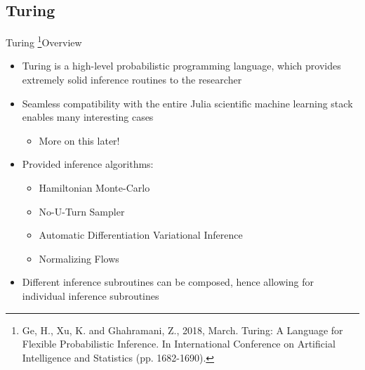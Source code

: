 \documentclass[AERbeamer%
              ,optEnglish%
              ,optBiber%
              ,optBibstyleAlphabetic%
              ,optBeamerClassicFormat%
              ]{AERlatex}%
\begin{document}
\subsection{Turing}
\begin{frame}[c]{Turing \footnote{Ge, H., Xu, K. and Ghahramani, Z., 2018, March. Turing: A Language for Flexible
                                  Probabilistic Inference. In International Conference on Artificial Intelligence
                                  and Statistics (pp. 1682-1690).}}{Overview}
    \centering
    \begin{itemize}
        \item Turing is a high-level probabilistic programming language, which provides extremely solid
              inference routines to the researcher
        \item Seamless compatibility with the entire Julia scientific machine learning stack enables many
              interesting cases
        \begin{itemize}
            \item More on this later!
        \end{itemize}
        \item Provided inference algorithms:
        \begin{itemize}
            \item Hamiltonian Monte-Carlo
            \item No-U-Turn Sampler
            \item Automatic Differentiation Variational Inference
            \item Normalizing Flows
        \end{itemize}
        \item Different inference subroutines can be composed, hence allowing for individual inference subroutines
    \end{itemize}
\end{frame}
\end{document}
